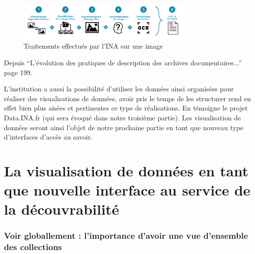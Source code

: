 \begin{figure}[h!]
	\centering
	\includegraphics[width=0.8\textwidth]{images/image11.png}
	\caption{Traitements effectués par l'INA sur une image}
	\label{fig:image11}
\end{figure}


\begin{center}
	Depuis \enquote{L'évolution des pratiques de description des archives documentaires...} page 199. 
\end{center}

L’institution a aussi la possibilité d'utiliser les données ainsi organisées pour réaliser des visualisations de données, avoir pris le temps de les structurer rend en effet bien plus aisées et pertinentes ce type de réalisations. En témoigne le projet Data.INA.fr (qui sera évoqué dans notre troisième partie). Les visualisation de données seront ainsi l’objet de notre prochaine partie en tant que nouveau type d'interfaces d'accès au savoir.

\chapter{La visualisation de données en tant que nouvelle interface au service de la découvrabilité}

\subsection{Voir globallement : l'importance d'avoir une vue d'ensemble des collections}


